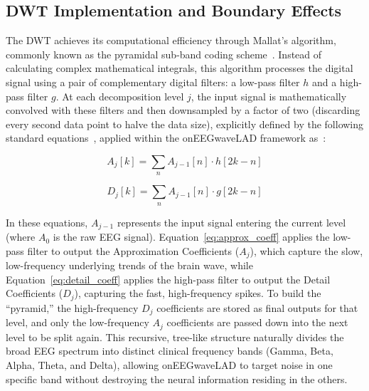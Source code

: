 \documentclass[MScCS,12pt,oneside,final]{uccthesis}
\begin{document}
        \subsection{DWT Implementation and Boundary Effects}
        \label{subsec:dwt_implementation}
        
        The DWT achieves its computational efficiency through Mallat's algorithm, commonly known as the pyramidal sub-band coding scheme~\parencite{mallat1989theory}. Instead of calculating complex mathematical integrals, this algorithm processes the digital signal using a pair of complementary digital filters: a low-pass filter $h$ and a high-pass filter $g$. At each decomposition level $j$, the input signal is mathematically convolved with these filters and then downsampled by a factor of two (discarding every second data point to halve the data size), explicitly defined by the following standard equations~\parencite{mallat1989theory}, applied within the onEEGwaveLAD framework as~\parencite{longo2025oneegwavelad}:

\begin{equation}
    A_j[k] = \sum_{n} A_{j-1}[n] \cdot h[2k - n]
    \label{eq:approx_coeff}
\end{equation}

\begin{equation}
    D_j[k] = \sum_{n} A_{j-1}[n] \cdot g[2k - n]
    \label{eq:detail_coeff}
\end{equation}
        
        In these equations, $A_{j-1}$ represents the input signal entering the current level (where $A_0$ is the raw EEG signal). Equation~\ref{eq:approx_coeff} applies the low-pass filter to output the Approximation Coefficients ($A_j$), which capture the slow, low-frequency underlying trends of the brain wave, while Equation~\ref{eq:detail_coeff} applies the high-pass filter to output the Detail Coefficients ($D_j$), capturing the fast, high-frequency spikes. To build the ``pyramid,'' the high-frequency $D_j$ coefficients are stored as final outputs for that level, and only the low-frequency $A_j$ coefficients are passed down into the next level to be split again. This recursive, tree-like structure naturally divides the broad EEG spectrum into distinct clinical frequency bands (Gamma, Beta, Alpha, Theta, and Delta), allowing onEEGwaveLAD to target noise in one specific band without destroying the neural information residing in the others.
        
\end{document}
